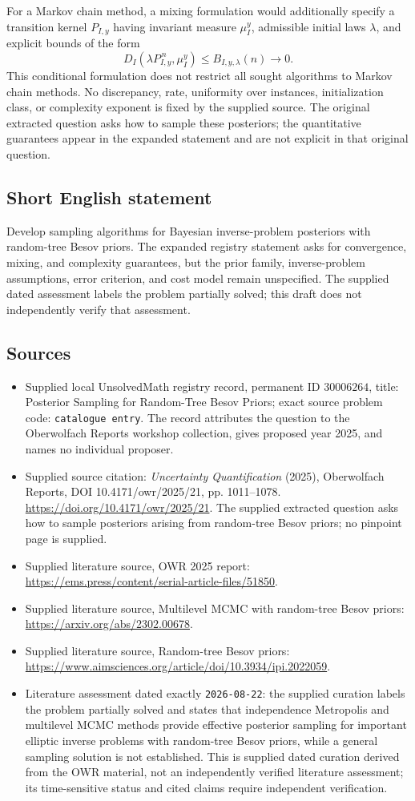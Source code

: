\documentclass[11pt]{article}
\begin{document}
For a Markov chain method, a mixing formulation would additionally specify a transition kernel \(P_{I,y}\) having invariant measure \(\mu_I^y\), admissible initial laws \(\lambda\), and explicit bounds of the form
\[
D_I(\lambda P_{I,y}^{\,n},\mu_I^y)\le B_{I,y,\lambda}(n)\longrightarrow0.
\]
This conditional formulation does not restrict all sought algorithms to Markov chain methods. No discrepancy, rate, uniformity over instances, initialization class, or complexity exponent is fixed by the supplied source. The original extracted question asks how to sample these posteriors; the quantitative guarantees appear in the expanded statement and are not explicit in that original question.
\subsection{Short English statement}
Develop sampling algorithms for Bayesian inverse-problem posteriors with random-tree Besov priors. The expanded registry statement asks for convergence, mixing, and complexity guarantees, but the prior family, inverse-problem assumptions, error criterion, and cost model remain unspecified. The supplied dated assessment labels the problem partially solved; this draft does not independently verify that assessment.
\subsection{Sources}
\begin{itemize}
\item Supplied local UnsolvedMath registry record, permanent ID \(30006264\), title: Posterior Sampling for Random-Tree Besov Priors; exact source problem code: \texttt{catalogue entry}. The record attributes the question to the Oberwolfach Reports workshop collection, gives proposed year 2025, and names no individual proposer.
\item Supplied source citation: \emph{Uncertainty Quantification} (2025), Oberwolfach Reports, DOI 10.4171/owr/2025/21, pp. 1011--1078. \url{https://doi.org/10.4171/owr/2025/21}. The supplied extracted question asks how to sample posteriors arising from random-tree Besov priors; no pinpoint page is supplied.
\item Supplied literature source, OWR 2025 report: \url{https://ems.press/content/serial-article-files/51850}.
\item Supplied literature source, Multilevel MCMC with random-tree Besov priors: \url{https://arxiv.org/abs/2302.00678}.
\item Supplied literature source, Random-tree Besov priors: \url{https://www.aimsciences.org/article/doi/10.3934/ipi.2022059}.
\item Literature assessment dated exactly \texttt{2026-08-22}: the supplied curation labels the problem partially solved and states that independence Metropolis and multilevel MCMC methods provide effective posterior sampling for important elliptic inverse problems with random-tree Besov priors, while a general sampling solution is not established. This is supplied dated curation derived from the OWR material, not an independently verified literature assessment; its time-sensitive status and cited claims require independent verification.
\end{itemize}
\end{document}
